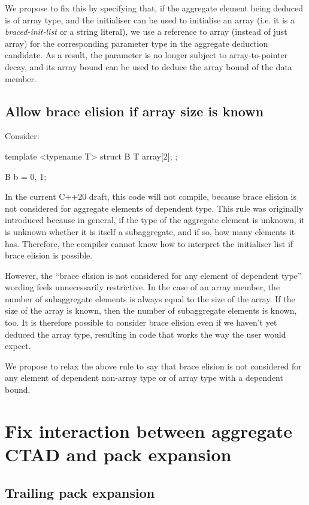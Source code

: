 We propose to fix this by specifying that, if the aggregate element being deduced is of array type, and the initialiser can be used to initialise an array (i.e. it is a \emph{braced-init-list} or a string literal), we use a reference to array (instead of just array) for the corresponding parameter type in the aggregate deduction candidate. As a result, the parameter is no longer subject to array-to-pointer decay, and its array bound can be used to deduce the array bound of the data member.

\subsection{Allow brace elision if array size is known}

Consider:

\begin{codeblock}
template <typename T>
struct B {
  T array[2];
};

B b = {0, 1};
\end{codeblock}

In the current C++20 draft, this code will not compile, because brace elision is not considered for aggregate elements of dependent type. This rule was originally introduced because in general, if the type of the aggregate element is unknown, it is unknown whether it is itself a subaggregate, and if so, how many elements it has. Therefore, the compiler cannot know how to interpret the initialiser list if brace elision is possible.

However, the ``brace elision is not considered for any element of dependent type'' wording feels unnecessarily restrictive. In the case of an array member, the number of subaggregate elements is always equal to the size of the array. If the size of the array is known, then the number of subaggregate elements is known, too. It is therefore possible to consider brace elision even if we haven't yet deduced the array type, resulting in code that works the way the user would expect.

We propose to relax the above rule to say that brace elision is not considered for any element of dependent non-array type or of array type with a dependent bound.
\section{Fix interaction between aggregate CTAD and pack expansion}

\subsection{Trailing pack expansion}

